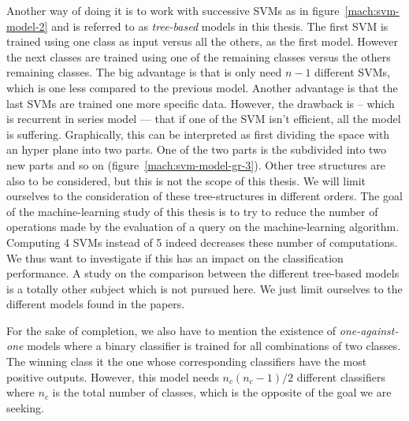 Another way of doing it is to work with successive SVMs as in figure~\ref{mach:svm-model-2} and is referred to as \emph{tree-based} models in this thesis. The first SVM is trained using one class as input versus all the others, as the first model. However the next classes are trained using one of the remaining classes versus the others remaining classes. The big advantage is that is only need $n-1$ different SVMs, which is one less compared to the previous model. Another advantage is that the last SVMs are trained one more specific data. However, the drawback is -- which is recurrent in series model --- that if one of the SVM isn't efficient, all the model is suffering. Graphically, this can be interpreted as first dividing the space with an hyper plane into two parts. One of the two parts is the subdivided into two new parts and so on (figure~\ref{mach:svm-model-gr-3}). Other tree structures are also to be considered, but this is not the scope of this thesis. We will limit ourselves to the consideration of these tree-structures in different orders. The goal of the machine-learning study of this thesis is to try to reduce the number of operations made by the evaluation of a query on the machine-learning algorithm. Computing 4 SVMs instead of 5 indeed decreases these number of computations. We thus want to investigate if this has an impact on the classification performance. A study on the comparison between the different tree-based models is a totally other subject which is not pursued here. We just limit ourselves to the different models found in the papers.

For the sake of completion, we also have to mention the existence of \emph{one-against-one} models where a binary classifier is trained for all combinations of two classes. The winning class it the one whose corresponding classifiers have the most positive outputs. However, this model needs $n_c(n_c-1)/2$ different classifiers where $n_c$ is the total number of classes, which is the opposite of the goal we are seeking.



